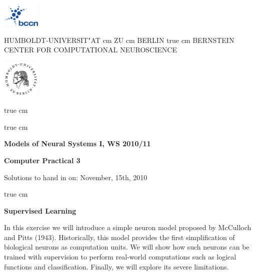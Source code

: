 \documentclass[12pt, a4]{article}
\begin{document}
\parbox{2cm}{
\includegraphics[width=1.8cm]{bccnlogo}
}
\parbox{11cm}{
\begin{center}
\large HUMBOLDT-UNIVERSIT"AT  cm ZU  cm BERLIN
 true cm
\mgross BERNSTEIN CENTER FOR COMPUTATIONAL NEUROSCIENCE
\end{center}
}
\parbox{2cm}
{
\hfill
\includegraphics[width=1.8cm]{hublogo}
}

 true cm





 true cm
\centerline{\bf Models of Neural Systems I, WS 2010/11}
\centerline{\bf Computer Practical 3}
\centerline{Solutions to hand in on: November, 15th, 2010}

 true cm

{\bf Supervised Learning}

\medskip

In this exercise we will introduce  a simple neuron model proposed by
McCulloch and Pitts (1943). Historically, this model provides the first
simplification of biological neurons as computation units. We will
show how such neurons can be trained with supervision to perform
real-world computations such as logical functions and classification.
Finally, we will explore its severe limitations. 

\end{document}
